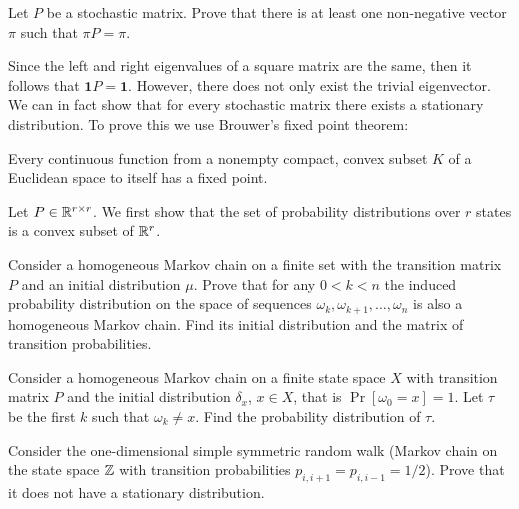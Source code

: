 \begin{problem}{1}
    Let $P$ be a stochastic matrix. Prove that there is at least one non-negative vector $\pi$ such that $\pi P = \pi$. 
\end{problem}
\begin{solution}
    Since the left and right eigenvalues of a square matrix are the same, then it follows that $\mathbf{1}P = \mathbf{1}$. However, there does not only exist the trivial eigenvector. We can in fact show that for every stochastic matrix there exists a stationary distribution. To prove this we use Brouwer's fixed point theorem:
    \begin{theorem}
        Every continuous function from a nonempty compact, convex subset $K$ of a Euclidean space to itself has a fixed point.
    \end{theorem}
    Let $P \in \mathbb{R}^{r\times r}$. We first show that the set of probability distributions over $r$ states is a convex subset of $\mathbb{R}^r$. 

\end{solution}

\begin{problem}{2}
    Consider a homogeneous Markov chain on a finite set with the transition matrix $P$ and an initial distribution $\mu$. Prove that for any $0 < k < n$ the induced probability distribution on the space of sequences $\omega_k,\omega_{k+1},\ldots, \omega_n$ is also a homogeneous Markov chain. Find its initial distribution and the matrix of transition probabilities.
\end{problem}
\begin{solution}
    
\end{solution}

\begin{problem}{3}
    Consider a homogeneous Markov chain on a finite state space $X$ with transition matrix $P$ and the initial distribution $\delta_x$, $x \in X$, that is $\Pr[\omega_0 = x] = 1$. Let $\tau$ be the first $k$ such that $\omega_k \neq x$. Find the probability distribution of $\tau$. 
\end{problem}
\begin{solution}

\end{solution}

\begin{problem}{4}
    Consider the one-dimensional simple symmetric random walk (Markov chain on the state space $\mathbb{Z}$ with transition probabilities $p_{i,i+1} = p_{i,i-1} = 1/2$). Prove that it does not have a stationary distribution.
\end{problem}
\begin{solution}
    
\end{solution}